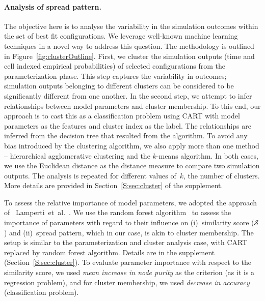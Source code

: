 \documentclass[11pt]{article}
\newcommand{\similarity}{\mathcal{S}}
\theoremstyle{definition}
\begin{document}

\paragraph{Analysis of spread pattern.} The objective here is to analyse
the variability in the simulation outcomes within the set of best fit
configurations. We leverage well-known machine learning techniques in a
novel way to address this question. The methodology is outlined in
Figure~\ref{fig:clusterOutline}. First, we cluster the simulation outputs
(time and cell indexed empirical probabilities) of selected configurations
from the parameterization phase. This step captures the variability in
outcomes; simulation outputs belonging to different clusters can be
considered to be significantly different from one another.  In the second
step, we attempt to infer relationships between model parameters and
cluster membership. To this end, our approach is to cast this as a
classification problem using CART with model parameters as the features and
cluster index as the label. The relationships are inferred from the
decision tree that resulted from the algorithm.  To avoid any bias
introduced by the clustering algorithm, we also apply more than one method
-- hierarchical agglomerative clustering and the $k$-means algorithm. In
both cases, we use the Euclidean distance as the distance measure to
compare two simulation outputs. The analysis is repeated for different
values of~$k$, the number of clusters.  More details are provided in
Section~\ref{S:sec:cluster} of the supplement. 

To assess the relative importance of model parameters, we adopted the
approach of~ Lamperti~et~al.~\cite{lamperti2018agent}. We use the random
forest algorithm~\cite{breiman2001random} to assess the importance of
parameters with regard to their influence on (i)~similarity score
($\similarity$) and (ii)~spread pattern, which in our case, is akin to
cluster membership. The setup is similar to the parameterization and
cluster analysis case, with CART replaced by random forest algorithm. 
Details are in the supplement (Section~\ref{S:sec:cluster}). To evaluate
parameter importance with respect to the similarity score, we used
\emph{mean increase in node purity} as the criterion (as it is a regression
problem), and for cluster membership, we used \emph{decrease in accuracy}
(classification problem).
\end{document}
